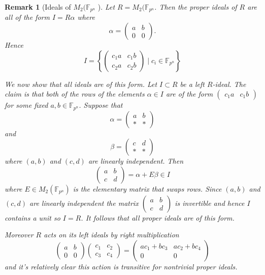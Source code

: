 \documentclass[10pt]{article}
\theoremstyle{plain}
\newtheorem{remark}[theorem]{Remark}
\theoremstyle{definition}
\newcommand{\F}{\mathbb{F}}
\begin{document}
\begin{remark}[Ideals of \( M_2(\F_{p^n} \) ]
    Let \( R =  M_2(\F_{p^n} \).
    Then the proper ideals of \( R \) are all of the form \( I = R\alpha \) where
    \[
        \alpha =
        \begin{pmatrix}
            a & b \\
            0 & 0
        \end{pmatrix}.
    \]
    Hence
    \[
        I = \left\{ \begin{pmatrix}
            c_1a & c_1b \\
            c_2a & c_2b
        \end{pmatrix} \mid c_i \in \F_{p^n} \right\}
    \]

    We now show that all ideals are of this form.
    Let \( I \subset R \) be a left \( R \)-ideal.
    The claim is that both of the rows of the elements \( \alpha \in I \) are of the form \( \begin{pmatrix} c_1a & c_1b\end{pmatrix} \) for some fixed \( a, b \in \F_{p^n} \).
    Suppose that
    \[
        \alpha =  \begin{pmatrix}
            a & b \\
            * & *
        \end{pmatrix}
    \]
    and
    \[
        \beta = \begin{pmatrix}
            c & d \\
            * & *
        \end{pmatrix}
    \]
    where \( (a, b) \) and \( (c, d) \) are linearly independent.
    Then
    \[
        \begin{pmatrix}
            a & b \\
            c & d
        \end{pmatrix} = \alpha + E \beta \in I
    \]
    where \( E \in M_2(\F_{p^n}) \) is the elementary matrix that swaps rows.
    Since \( (a, b) \) and \( (c, d) \) are linearly independent the matrix \( \begin{pmatrix}
        a & b \\
        c & d
    \end{pmatrix} \) is invertible and hence \( I \) contains a unit so \( I = R \).
    It follows that all proper ideals are of this form.

    Moreover \( R \) acts on its left ideals by right multiplication
    \[
        \begin{pmatrix}
            a & b \\
            0 & 0
        \end{pmatrix}
        \begin{pmatrix}
            c_1 & c_2 \\
            c_3 & c_4
        \end{pmatrix}
        =
        \begin{pmatrix}
            ac_1 + bc_3 & ac_2 + bc_4 \\
            0           & 0
        \end{pmatrix}
    \]
    and it's relatively clear this action is transitive for nontrivial proper ideals.

\end{remark}
\end{document}
